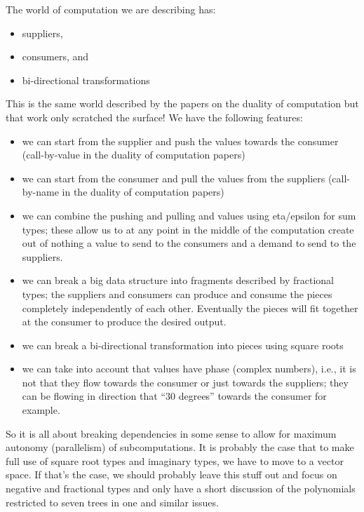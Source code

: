 \documentclass[preprint]{sigplanconf}
\begin{document}
The world of computation we are describing has:
\begin{itemize}
\item suppliers, 
\item consumers, and
\item bi-directional transformations
\end{itemize}
This is the same world described by the papers on the duality of computation
but that work only scratched the surface! We have the following features:
\begin{itemize}
\item we can start from the supplier and push the values towards the
  consumer (call-by-value in the duality of computation papers)
\item we can start from the consumer and pull the values from the suppliers
  (call-by-name in the duality of computation papers)
\item we can combine the pushing and pulling and values using eta/epsilon for
  sum types; these allow us to at any point in the middle of the computation
  create out of nothing a value to send to the consumers and a demand to send
  to the suppliers.
\item we can break a big data structure into fragments described by
  fractional types; the suppliers and consumers can produce and consume the
  pieces completely independently of each other. Eventually the pieces will
  fit together at the consumer to produce the desired output.
\item we can break a bi-directional transformation into pieces using square
  roots
\item we can take into account that values have phase (complex numbers),
  i.e., it is not that they flow towards the consumer or just towards the
  suppliers; they can be flowing in direction that ``30 degrees'' towards the
  consumer for example.
\end{itemize}
So it is all about breaking dependencies in some sense to allow for maximum
autonomy (parallelism) of subcomputations. It is probably the case that to
make full use of square root types and imaginary types, we have to move to a
vector space. If that's the case, we should probably leave this stuff out and
focus on negative and fractional types and only have a short discussion of
the polynomials restricted to seven trees in one and similar issues.
\end{document}
